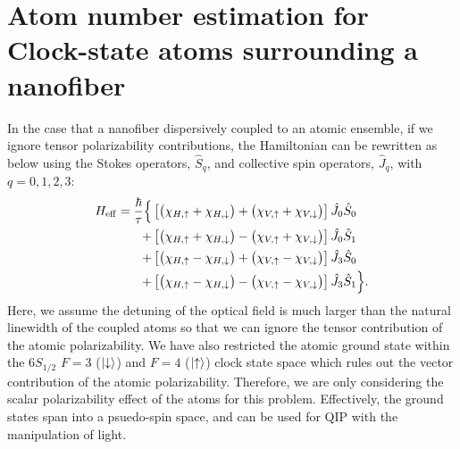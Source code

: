 \chapter{Atom number estimation for Clock-state atoms surrounding a nanofiber}
In the case that a nanofiber dispersively coupled to an atomic ensemble, if we ignore tensor 
polarizability contributions, the Hamiltonian can be rewritten as below using the Stokes operators, $ 
\hat{S}_q $, and collective spin operators, $ \hat{J}_q $, with $ q=0,1,2,3 $:
\begin{align}
H_{\rm eff} 
=\frac{\hbar}{\tau} \Big\{ & \left[ \big( \chi_{H,\uparrow} + \chi_{H,\downarrow}\big) + \big(\chi_{V,\uparrow} + \chi_{V,\downarrow}\big) \right] \hat{J}_0 \hat{S}_0 \nonumber \\
+ & \left[ \big( \chi_{H, \uparrow} + \chi_{H,\downarrow}\big) - \big( \chi_{V,\uparrow} + \chi_{V,\downarrow} \big)\right]  \hat{J}_0 \hat{S}_1 \nonumber \\
+ & \left[ \big( \chi_{H,\uparrow} - \chi_{H,\downarrow}\big) + \big(\chi_{V,\uparrow} - \chi_{V,\downarrow} \big) \right] \hat{J}_3 \hat{S}_0 \nonumber \\
+ & \left[ \big( \chi_{H,\uparrow} - \chi_{H,\downarrow}\big) - \big(\chi_{V,\uparrow} - \chi_{V,\downarrow} \big) \right]  \hat{J}_3 \hat{S}_1\Big\}.\label{eq:JScoupling}
\end{align}
Here, we assume the detuning of the optical field is much larger than the natural linewidth of the 
coupled atoms so that we can ignore the tensor contribution of the atomic polarizability. We have also 
restricted the atomic ground state within the $ 6S_{1/2} $ $ F=3 $ ($ \lvert{\downarrow}\rangle $) and $ F=4 $ ($ 
\lvert{\uparrow}\rangle $) clock state space which rules out the vector contribution of 
the atomic polarizability. Therefore, we are only considering the scalar polarizability effect of the atoms 
for this problem. Effectively, the ground states span into a psuedo-spin space, and 
can be used for QIP with the manipulation of light. 

